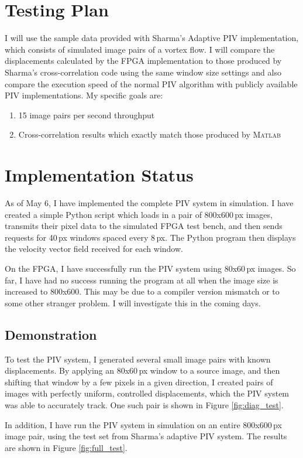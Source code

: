 \documentclass{article}
\begin{document}
\section{Testing Plan}
I will use the sample data provided with Sharma's Adaptive PIV implementation, which consists of simulated image pairs of a vortex flow. I will compare the displacements calculated by the FPGA implementation to those produced by Sharma's cross-correlation code using the same window size settings and also compare the execution speed of the normal PIV algorithm with publicly available PIV implementations. My specific goals are:
\begin{enumerate}
	\item 15 image pairs per second throughput
	\item Cross-correlation results which exactly match those produced by \textsc{Matlab}
\end{enumerate}

\section{Implementation Status}
As of May 6, I have implemented the complete PIV system in simulation. I have created a simple Python script which loads in a pair of 800x600\,px images, transmits their pixel data to the simulated FPGA test bench, and then sends requests for 40\,px windows spaced every 8\,px. The Python program then displays the velocity vector field received for each window. 

On the FPGA, I have successfully run the PIV system using 80x60\,px images. So far, I have had no success running the program at all when the image size is increased to 800x600. This may be due to a compiler version mismatch or to some other stranger problem. I will investigate this in the coming days. 

\subsection{Demonstration}
To test the PIV system, I generated several small image pairs with known displacements. By applying an 80x60\,px window to a source image, and then shifting that window by a few pixels in a given direction, I created pairs of images with perfectly uniform, controlled displacements, which the PIV system was able to accurately track. One such pair is shown in Figure \ref{fig:diag_test}. 

In addition, I have run the PIV system in simulation on an entire 800x600\,px image pair, using the test set from Sharma's adaptive PIV system. The results are shown  in Figure \ref{fig:full_test}. 
\end{document}
